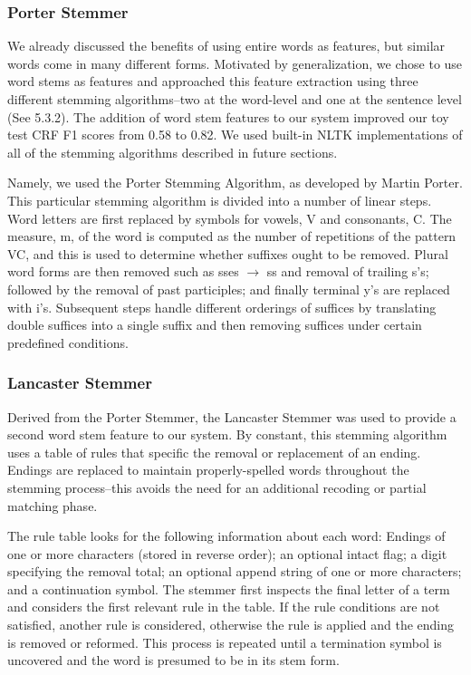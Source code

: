 \documentclass[preprint]{style}
\begin{document}
\subsubsection{Porter Stemmer}
We already discussed the benefits of using entire words as features, but similar words come in many different forms. Motivated by generalization, we chose to use word stems as features and approached this feature extraction using three different stemming algorithms--two at the word-level and one at the sentence level (See 5.3.2). The addition of word stem features to our system improved our toy test CRF F1 scores from 0.58 to 0.82. We used built-in NLTK implementations of all of the stemming algorithms described in future sections.

Namely, we used the Porter Stemming Algorithm, as developed by Martin Porter.  This particular stemming algorithm is divided into a number of linear steps. Word letters are first replaced by symbols for vowels, V and consonants, C. The measure, m, of the word is computed as the number of repetitions of the pattern VC, and this is used to determine whether suffixes ought to be removed. Plural word forms are then removed such as  sses $\rightarrow$ ss and removal of trailing s's; followed by the removal of past participles; and finally terminal y's are replaced with i's. Subsequent steps handle different orderings of suffices by translating double suffices into a single suffix and then removing suffices under certain predefined conditions.

\subsubsection{Lancaster Stemmer}

Derived from the Porter Stemmer, the Lancaster Stemmer was used to provide a second word stem feature to our system. By constant, this stemming algorithm uses a table of rules that specific the removal or replacement of an ending. Endings are replaced to maintain properly-spelled words throughout the stemming process--this avoids the need for an additional recoding or partial matching phase. 

The rule table looks for the following information about each word: Endings of one or more characters (stored in reverse order); an optional intact flag; a digit specifying the removal total;  an optional append string of one or more characters;  and a continuation symbol. The stemmer first inspects the final letter of a term and considers the first relevant rule in the table. If the rule conditions are not satisfied, another rule is considered, otherwise the rule is applied and the ending is removed or reformed. This process is repeated until a termination symbol is uncovered and the word is presumed to be in its stem form.
\end{document}
